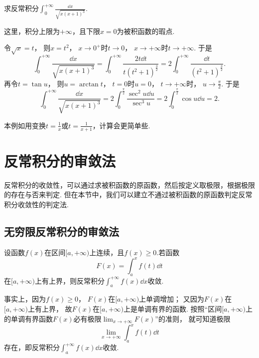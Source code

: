 \begin{example}
求反常积分\(\int_0^{+\infty} \frac{\dd{x}}{\sqrt{x(x+1)^3}}\).
\begin{solution}
这里，积分上限为\(+\infty\)，且下限\(x=0\)为被积函数的瑕点.

令\(\sqrt{x} = t\)，
则\(x = t^2\)，
\(x\to0^+\)时\(t\to0\)，
\(x\to+\infty\)时\(t\to+\infty\).
于是\[
	\int_0^{+\infty} \frac{\dd{x}}{\sqrt{x(x+1)^3}}
	= \int_0^{+\infty} \frac{2t\dd{t}}{t(t^2+1)^{\frac32}}
	= 2 \int_0^{+\infty} \frac{\dd{t}}{(t^2+1)^{\frac32}}.
\]
再令\(t = \tan u\)，
则\(u = \arctan t\)，
\(t=0\)时\(u=0\)，
\(t\to+\infty\)时，
\(u\to\frac\pi2\).
于是\[
	\int_0^{+\infty} \frac{\dd{x}}{\sqrt{x(x+1)^3}}
	= 2 \int_0^{\frac\pi2} \frac{\sec^2 u \dd{u}}{\sec^3 u}
	= 2 \int_0^{\frac\pi2} \cos u \dd{u}
	= 2.
\]
\end{solution}
本例如用变换\(t = \frac{1}{x}\)或\(t = \frac{1}{x+1}\)，计算会更简单些.
\end{example}

\section{反常积分的审敛法}
反常积分的收敛性，可以通过求被积函数的原函数，然后按定义取极限，根据极限的存在与否来判定.
但在本节中，我们可以建立不通过被积函数的原函数判定反常积分收敛性的判定法.

\subsection{无穷限反常积分的审敛法}
\begin{theorem}\label{theorem:定积分.无穷限反常积分的审敛法引理}
设函数\(f(x)\)在区间\([a,+\infty)\)上连续，且\(f(x) \geq 0\).若函数\[
F(x)=\int_a^x f(t) \dd{t}
\]在\([a,+\infty)\)上有上界，则反常积分\(\int_a^{+\infty} f(x) \dd{x}\)收敛.
\end{theorem}
事实上，因为\(f(x)\geq0\)，
\(F(x)\)在\([a,+\infty)\)上单调增加；
又因为\(F(x)\)在\([a,+\infty)\)上有上界，
故\(F(x)\)在\([a,+\infty)\)上是单调有界的函数.
按照“区间\([a,+\infty)\)上的单调有界函数\(F(x)\)必有极限\(\lim_{x\to+\infty} F(x)\)”的准则，
就可知道极限\[
	\lim_{x\to+\infty} \int_a^x f(t) \dd{t}
\]存在，即反常积分\(\int_a^{+\infty} f(x) \dd{x}\)收敛.

